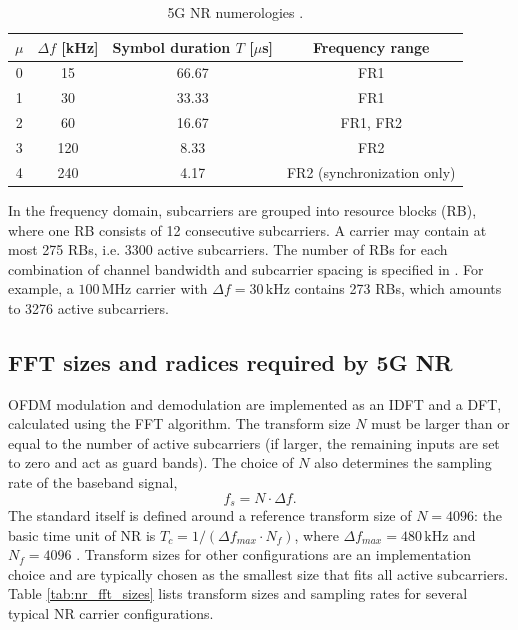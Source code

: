 \documentclass[a4paper,12pt, master]{etf}
\begin{document}
\begin{table}[htb]
\centering
\caption{5G NR numerologies \cite{17}.}
\medskip
\label{tab:nr_numerologies}
\begin{tabular}{c | c | c | c}
\hline
$\mu$ & $\Delta f$ [kHz] & Symbol duration $T$ [$\mu$s] & Frequency range\\
\hline
\hline
0 & 15 & 66.67 & FR1\\
\hline
1 & 30 & 33.33 & FR1\\
\hline
2 & 60 & 16.67 & FR1, FR2\\
\hline
3 & 120 & 8.33 & FR2\\
\hline
4 & 240 & 4.17 & FR2 (synchronization only)\\
\hline
\end{tabular}
\end{table}

In the frequency domain, subcarriers are grouped into resource blocks (RB), where one RB consists of 12 consecutive subcarriers. A carrier may contain at most 275 RBs, i.e. 3300 active subcarriers. The number of RBs for each combination of channel bandwidth and subcarrier spacing is specified in \cite{18}. For example, a $100\,\mathrm{MHz}$ carrier with $\Delta f = 30\,\mathrm{kHz}$ contains 273 RBs, which amounts to 3276 active subcarriers.

\subsection{FFT sizes and radices required by 5G NR}
\label{subsec:nr_fft_sizes}

OFDM modulation and demodulation are implemented as an IDFT and a DFT, calculated using the FFT algorithm. The transform size $N$ must be larger than or equal to the number of active subcarriers (if larger, the remaining inputs are set to zero and act as guard bands). The choice of $N$ also determines the sampling rate of the baseband signal,
\begin{equation}
    f_s = N \cdot \Delta f.
\label{eq:nr_sampling_rate}
\end{equation}
The standard itself is defined around a reference transform size of $N = 4096$: the basic time unit of NR is $T_c = 1/(\Delta f_{max} \cdot N_f)$, where $\Delta f_{max} = 480\,\mathrm{kHz}$ and $N_f = 4096$ \cite{17}. Transform sizes for other configurations are an implementation choice and are typically chosen as the smallest size that fits all active subcarriers. Table \ref{tab:nr_fft_sizes} lists transform sizes and sampling rates for several typical NR carrier configurations.
\end{document}
